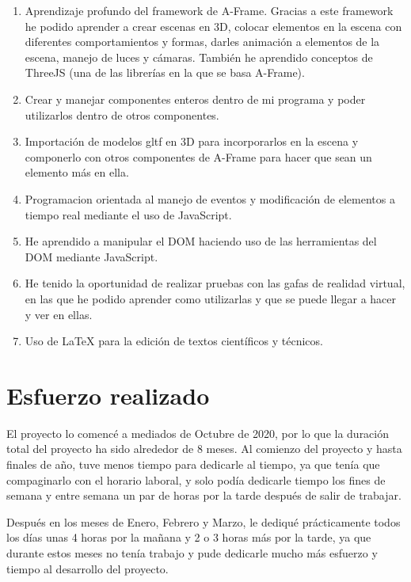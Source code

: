 \documentclass[a4paper, 12pt]{book}
\begin{document}
\begin{enumerate}
  \item Aprendizaje profundo del framework de A-Frame. Gracias a este framework he podido aprender a crear escenas en 3D, colocar elementos en la escena con diferentes comportamientos y formas, darles animación a elementos de la escena, manejo de luces y cámaras. También he aprendido conceptos de ThreeJS (una de las librerías en la que se basa A-Frame).
  
  \item Crear y manejar componentes enteros dentro de mi programa y poder utilizarlos dentro de otros componentes.
  
  \item Importación de modelos gltf en 3D para incorporarlos en la escena y componerlo con otros componentes de A-Frame para hacer que sean un elemento más en ella.
  
  \item Programacion orientada al manejo de eventos y modificación de elementos a tiempo real mediante el uso de JavaScript.
  
  \item He aprendido a manipular el DOM haciendo uso de las herramientas del DOM mediante JavaScript.
  
  \item He tenido la oportunidad de realizar pruebas con las gafas de realidad virtual, en las que he podido aprender como utilizarlas y que se puede llegar a hacer y ver en ellas.
  
  \item Uso de LaTeX para la edición de textos científicos y técnicos.
  
\end{enumerate}

\newpage

\section{Esfuerzo realizado}
\label{sec:esfuerzo}

El proyecto lo comencé a mediados de Octubre de 2020, por lo que la duración total del proyecto ha sido alrededor de 8 meses. Al comienzo del proyecto y hasta finales de año, tuve menos tiempo para dedicarle al tiempo, ya que tenía que compaginarlo con el horario laboral, y solo podía dedicarle tiempo los fines de semana y entre semana un par de horas por la tarde después de salir de trabajar.

Después en los meses de Enero, Febrero y Marzo, le dediqué prácticamente todos los días unas 4 horas por la mañana y 2 o 3 horas más por la tarde, ya que durante estos meses no tenía trabajo y pude dedicarle mucho más esfuerzo y tiempo al desarrollo del proyecto.
\end{document}
